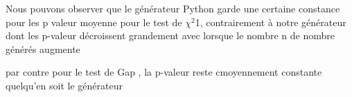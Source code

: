     Nous pouvons observer que le générateur Python garde une certaine constance pour les p valeur moyenne pour le test de $\chi^2$1, contrairement à notre générateur dont les p-valeur décroissent grandement avec lorsque le nombre n de nombre générés augmente

    par contre pour le test de Gap , la p-valeur reste cmoyennement constante quelqu'en
    soit le générateur 